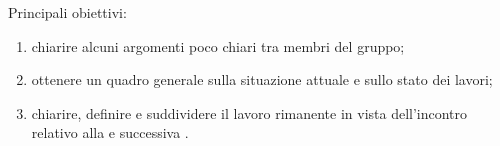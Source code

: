Principali obiettivi:
\begin{enumerate}
    \item chiarire alcuni argomenti poco chiari tra membri del gruppo;
    \item ottenere un quadro generale sulla situazione attuale e sullo stato dei lavori;
    \item chiarire, definire e suddividere il lavoro rimanente in vista dell'incontro relativo alla  e successiva \RP{}.
\end{enumerate}